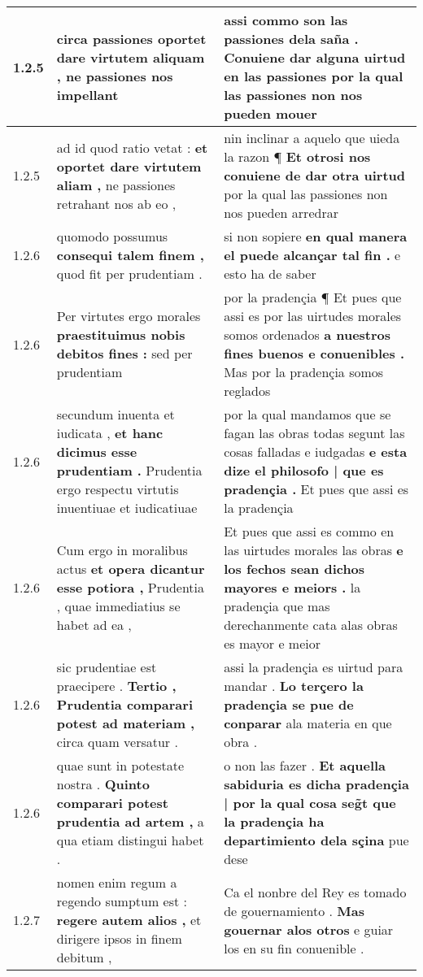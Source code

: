 \begin{tabular}{|p{1cm}|p{6.5cm}|p{6.5cm}|}
1.2.5 & circa passiones oportet \textbf{ dare virtutem aliquam , } ne passiones nos impellant & assi commo son las passiones dela saña . \textbf{ Conuiene dar alguna uirtud en las passiones } por la qual las passiones non nos pueden mouer \\\hline
1.2.5 & ad id quod ratio vetat : \textbf{ et oportet dare virtutem aliam , } ne passiones retrahant nos ab eo , & nin inclinar a aquelo que uieda la razon ¶ \textbf{ Et otrosi nos conuiene de dar otra uirtud } por la qual las passiones non nos pueden arredrar \\\hline
1.2.6 & quomodo possumus \textbf{ consequi talem finem , } quod fit per prudentiam . & si non sopiere \textbf{ en qual manera el puede alcançar tal fin . } e esto ha de saber \\\hline
1.2.6 & Per virtutes ergo morales \textbf{ praestituimus nobis debitos fines : } sed per prudentiam & por la pradençia ¶ Et pues que assi es por las uirtudes morales somos ordenados \textbf{ a nuestros fines buenos e conuenibles . } Mas por la pradençia somos reglados \\\hline
1.2.6 & secundum inuenta et iudicata , \textbf{ et hanc dicimus esse prudentiam . } Prudentia ergo respectu virtutis inuentiuae et iudicatiuae & por la qual mandamos que se fagan las obras todas segunt las cosas falladas e iudgadas \textbf{ e esta dize el philosofo | que es pradençia . } Et pues que assi es la pradençia \\\hline
1.2.6 & Cum ergo in moralibus actus \textbf{ et opera dicantur esse potiora , } Prudentia , quae immediatius se habet ad ea , & Et pues que assi es commo en las uirtudes morales las obras \textbf{ e los fechos sean dichos mayores e meiors . } la pradençia que mas derechanmente cata alas obras es mayor e meior \\\hline
1.2.6 & sic prudentiae est praecipere . \textbf{ Tertio , Prudentia comparari potest ad materiam , } circa quam versatur . & assi la pradençia es uirtud para mandar . \textbf{ Lo terçero la pradençia se pue de conparar } ala materia en que obra . \\\hline
1.2.6 & quae sunt in potestate nostra . \textbf{ Quinto comparari potest prudentia ad artem , } a qua etiam distingui habet . & o non las fazer . \textbf{ Et aquella sabiduria es dicha pradençia | por la qual cosa seg̃t que la pradençia ha departimiento dela sçina } pue dese \\\hline
1.2.7 & nomen enim regum a regendo sumptum est : \textbf{ regere autem alios , } et dirigere ipsos in finem debitum , & Ca el nonbre del Rey es tomado de gouernamiento . \textbf{ Mas gouernar alos otros } e guiar los en su fin conuenible . \\\hline

\end{tabular}
